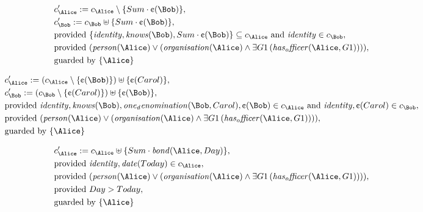 \begin{align*}
&
c'_
{
\Alice
}
 := 
c_
{
\Alice
}
 \setminus 
\{
Sum
\cdot
\text{\textcent}
(
\Bob
)
\}
,\\
&
c'_
{
\Bob
}
 := 
c_
{
\Bob
}
 \uplus 
\{
Sum
\cdot
\text{\textcent}
(
\Bob
)
\}
,\\
&
\text{provided } 
\{
\mathit{
identity
}
,
\mathit{
knows
}
(
\Bob
)
,
Sum
\cdot
\text{\textcent}
(
\Bob
)
\}
 \subseteq c_
{
\Alice
}
 \text{ and } 
\mathit{
identity
}
 \in c_
{
\Bob
}
,\\
&
\text{provided } 
(
\mathit{
person
}
(
\Alice
)
\lor
(
\mathit{
organisation
}
(
\Alice
)
\land
\exists 
G1
\,(
\mathit{
has_officer
}
(
\Alice
,
G1
)
)
)
)
,\\
&
\text{guarded by } \{
\Alice
\}
\end{align*}

\begin{align*}
&
c'_
{
\Alice
}
 := 
(c_
{
\Alice
}
 \setminus 
\{
\text{\textcent}
(
\Bob
)
\}
) \uplus 
\{
\text{\textcent}
(
Carol
)
\}
,\\
&
c'_
{
\Bob
}
 := 
(c_
{
\Bob
}
 \setminus 
\{
\text{\textcent}
(
Carol
)
\}
) \uplus 
\{
\text{\textcent}
(
\Bob
)
\}
,\\
&
\text{provided } 
\mathit{
identity
}
,
\mathit{
knows
}
(
\Bob
)
,
\mathit{
one_denomination
}
(
\Bob
,
Carol
)
,
\text{\textcent}
(
\Bob
)
 \in c_
{
\Alice
}
 \text{ and } 
\mathit{
identity
}
,
\text{\textcent}
(
Carol
)
 \in c_
{
\Bob
}
,\\
&
\text{provided } 
(
\mathit{
person
}
(
\Alice
)
\lor
(
\mathit{
organisation
}
(
\Alice
)
\land
\exists 
G1
\,(
\mathit{
has_officer
}
(
\Alice
,
G1
)
)
)
)
,\\
&
\text{guarded by } \{
\Alice
\}
\end{align*}

\begin{align*}
&
c'_
{
\Alice
}
 := 
c_
{
\Alice
}
 \uplus 
\{
Sum
\cdot
\mathit{
bond
}
(
\Alice
,
Day
)
\}
,\\
&
\text{provided } 
\mathit{
identity
}
,
\mathit{
date
}
(
Today
)
 \in c_
{
\Alice
}
,\\
&
\text{provided } 
(
\mathit{
person
}
(
\Alice
)
\lor
(
\mathit{
organisation
}
(
\Alice
)
\land
\exists 
G1
\,(
\mathit{
has_officer
}
(
\Alice
,
G1
)
)
)
)
,\\
&
\text{provided } 
Day
>
Today
,\\
&
\text{guarded by } \{
\Alice
\}
\end{align*}

